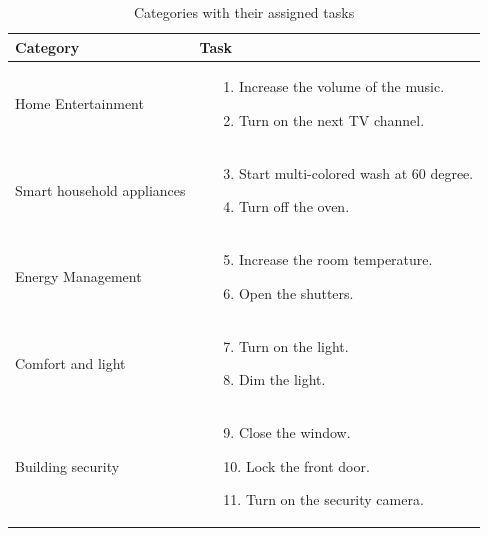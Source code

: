 \documentclass[sigchi]{acmart}
\begin{document}
	\begin{table}[t]
		\caption{Categories with their assigned tasks}
		\label{tab:tasks}
		\begin{small}
			\begin{tabular}{p{} p{}} \toprule
				\textbf{Category}			& \textbf{Task} \\ \midrule
				Home Entertainment         	& \begin{itemize}
					\item[1.] Increase the volume of the music.
					\item[2.] Turn on the next TV channel.  
				\end{itemize} \\ \midrule
				Smart household appliances 	& \begin{itemize}
					\item[3.] Start multi-colored wash at 60 degree.
					\item[4.] Turn off the oven.   
				\end{itemize} \\ \midrule
				Energy Management          	& \begin{itemize}
					\item[5.] Increase the room temperature.   
					\item[6.] Open the shutters.    
				\end{itemize} \\ \midrule
				Comfort and light          	& \begin{itemize}
					\item[7.] Turn on the light.      
					\item[8.] Dim the light.          
				\end{itemize} \\ \midrule
				Building security          	& \begin{itemize}
					\item[9.] Close the window.     
					\item[10.] Lock the front door. 
					\item[11.]  Turn on the security camera.
				\end{itemize} \\ \bottomrule
				
			\end{tabular}
		\end{small}
	\end{table}
	
\end{document}
